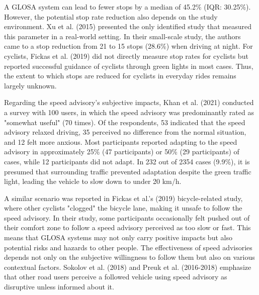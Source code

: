 A GLOSA system can lead to fewer stops by a median of 45.2\% (IQR: 30.25\%). However, the potential stop rate reduction also depends on the study environment. Xu et al. (2015) \cite{xu_bb_2015} presented the only identified study that measured this parameter in a real-world setting. In their small-scale study, the authors came to a stop reduction from 21 to 15 stops (28.6\%) when driving at night. For cyclists, Fickas et al. (2019) \cite{fickas_fast_2019} did not directly measure stop rates for cyclists but reported successful guidance of cyclists through green lights in most cases. Thus, the extent to which stops are reduced for cyclists in everyday rides remains largely unknown.

Regarding the speed advisory's subjective impacts, Khan et al. (2021) \cite{khan_eco-drive_2021} conducted a survey with 100 users, in which the speed advisory was predominantly rated as "somewhat useful" (70 times). Of the respondents, 53 indicated that the speed advisory relaxed driving, 35 perceived no difference from the normal situation, and 12 felt more anxious. Most participants reported adapting to the speed advisory in approximately 25\% (47 participants) or 50\% (29 participants) of cases, while 12 participants did not adapt. In 232 out of 2354 cases (9.9\%), it is presumed that surrounding traffic prevented adaptation despite the green traffic light, leading the vehicle to slow down to under 20 km/h. 

A similar scenario was reported in Fickas et al.'s (2019) \cite{fickas_fast_2019} bicycle-related study, where other cyclists "clogged" the bicycle lane, making it unsafe to follow the speed advisory. In their study, some participants occasionally felt pushed out of their comfort zone to follow a speed advisory perceived as too slow or fast. This means that GLOSA systems may not only carry positive impacts but also potential risks and hazards to other people. The effectiveness of speed advisories depends not only on the subjective willingness to follow them but also on various contextual factors. Sokolov et al. (2018) \cite{sokolov_effects_2018} and Preuk et al. (2016-2018) \cite{preuk_does_2016, preuk_should_2018} emphasize that other road users perceive a followed vehicle using speed advisory as disruptive unless informed about it.


